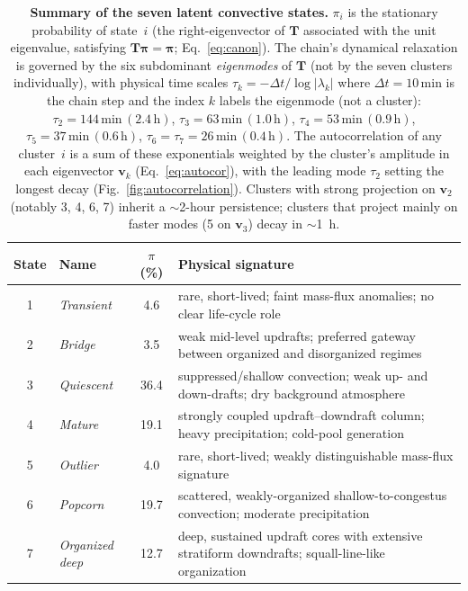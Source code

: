 \documentclass[11pt]{article}
\begin{document}
\begin{table}[t]
\centering
\small
\begin{tabular}{@{}c l c p{}@{}}
\hline
State & Name & $\pi$ (\%) & Physical signature \\
\hline
1 & \emph{Transient}      &  4.6 & rare, short-lived; faint mass-flux anomalies; no clear life-cycle role \\
2 & \emph{Bridge}         &  3.5 & weak mid-level updrafts; preferred gateway between organized and disorganized regimes \\
3 & \emph{Quiescent}      & 36.4 & suppressed/shallow convection; weak up- and down-drafts; dry background atmosphere \\
4 & \emph{Mature}         & 19.1 & strongly coupled updraft--downdraft column; heavy precipitation; cold-pool generation \\
5 & \emph{Outlier}        &  4.0 & rare, short-lived; weakly distinguishable mass-flux signature \\
6 & \emph{Popcorn}        & 19.7 & scattered, weakly-organized shallow-to-congestus convection; moderate precipitation \\
7 & \emph{Organized deep} & 12.7 & deep, sustained updraft cores with extensive stratiform downdrafts; squall-line-like organization \\
\hline
\end{tabular}
\caption{\textbf{Summary of the seven latent convective states.}
$\pi_i$ is the stationary probability of state~$i$ (the right-eigenvector of $\mathbf{T}$ associated with the unit eigenvalue, satisfying $\mathbf{T}\boldsymbol{\pi}=\boldsymbol{\pi}$; Eq.~\ref{eq:canon}). The chain's dynamical relaxation is governed by the six subdominant \emph{eigenmodes} of $\mathbf{T}$ (not by the seven clusters individually), with physical time scales $\tau_k = -\Delta t / \log|\lambda_k|$ where $\Delta t = 10\,\mathrm{min}$ is the chain step and the index $k$ labels the eigenmode (not a cluster):
$\tau_2 = 144\,\mathrm{min}\,(2.4\,\mathrm{h})$,
$\tau_3 = 63\,\mathrm{min}\,(1.0\,\mathrm{h})$,
$\tau_4 = 53\,\mathrm{min}\,(0.9\,\mathrm{h})$,
$\tau_5 = 37\,\mathrm{min}\,(0.6\,\mathrm{h})$,
$\tau_6 = \tau_7 = 26\,\mathrm{min}\,(0.4\,\mathrm{h})$.
The autocorrelation of any cluster~$i$ is a sum of these exponentials weighted by the cluster's amplitude in each eigenvector $\mathbf{v}_k$ (Eq.~\ref{eq:autocor}), with the leading mode $\tau_2$ setting the longest decay (Fig.~\ref{fig:autocorrelation}). Clusters with strong projection on $\mathbf{v}_2$ (notably 3, 4, 6, 7) inherit a $\sim$2-hour persistence; clusters that project mainly on faster modes (5 on $\mathbf{v}_3$) decay in $\sim$1~h.}
\label{tab:state_summary}
\end{table}
\end{document}
